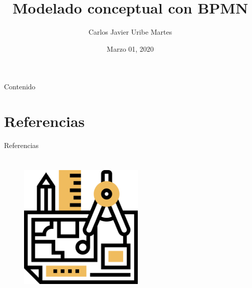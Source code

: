 \documentclass[aspectratio=43, xcolor=table]{beamer}
\title{Modelado conceptual con BPMN} %
\author[C.J. Uribe-Martes]{Carlos Javier Uribe Martes}
\institute[CUC]{
    Ingeniería Industrial%
    \\%
    Universidad de la Costa%
} %
\date{Marzo 01, 2020}
\begin{document}
    
    \frame{\titlepage}
    
    \begin{frame}{Contenido}
        \tableofcontents
    \end{frame}
    
    
    
    
    
    
    \section*{Referencias} %
    \nocite{freund}
        \begin{frame}{Referencias}
            \printbibliography
        \end{frame}
     
    \section{}   
        \begin{frame}{}
            \begin{figure}
                \centering
                \includegraphics[width=6cm]{images/model.png}
            \end{figure}
        \end{frame}
\end{document}
